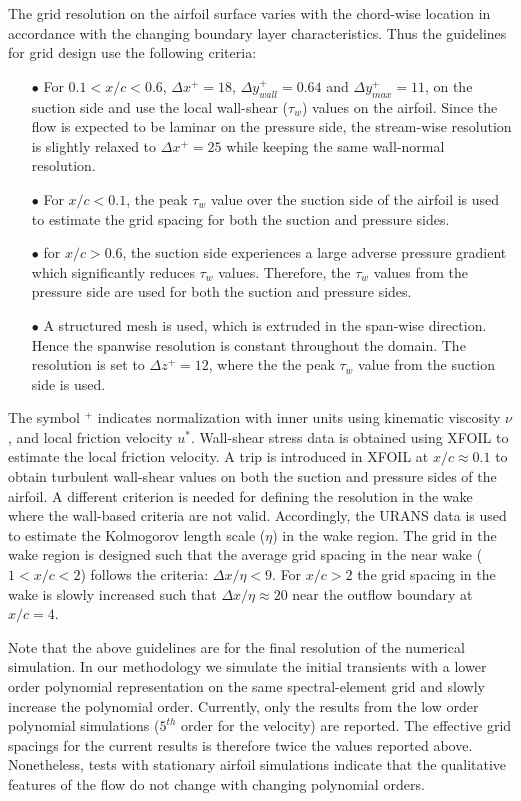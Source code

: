 The grid resolution on the airfoil surface varies with the chord-wise location in accordance with the changing boundary layer characteristics. Thus the guidelines for grid design use the following criteria:
\begin{itemize}
	\item[$\bullet$] For $0.1<x/c<0.6$, $\Delta x^{+}=18$, $\Delta y_{wall}^{+}=0.64$ and $\Delta y_{max}^{+}=11$, on the suction side and use the local wall-shear ($\tau_{w}$) values on the airfoil. Since the flow is expected to be laminar on the pressure side, the stream-wise resolution is slightly relaxed to $\Delta x^{+}=25$ while keeping the same wall-normal resolution.
	\item[$\bullet$] For $x/c<0.1$, the peak $\tau_{w}$ value over the suction side of the airfoil is used to estimate the grid spacing for both the suction and pressure sides.
	\item [$\bullet$] for $x/c>0.6$, the suction side experiences a large adverse pressure gradient which significantly reduces $\tau_{w}$ values. Therefore, the $\tau_{w}$ values from the pressure side are used for both the suction and pressure sides.
	\item [$\bullet$] A structured mesh is used, which is extruded in the span-wise direction. Hence the spanwise resolution is constant throughout the domain. The resolution is set to $\Delta z^{+}=12$, where the the peak $\tau_{w}$ value from the suction side is used.
\end{itemize}
The symbol $^{+}$ indicates normalization with inner units using kinematic viscosity $\nu$, and local friction velocity $u^{*}$. Wall-shear stress data is obtained using XFOIL to estimate the local friction velocity. A trip is introduced in XFOIL at $x/c\approx0.1$ to obtain turbulent wall-shear values on both the suction and pressure sides of the airfoil. A different criterion is needed for defining the resolution in the wake where the wall-based criteria are not valid. Accordingly, the URANS data is used to estimate the Kolmogorov length scale ($\eta$) in the wake region. The grid in the wake region is designed such that the average grid spacing in the near wake ($1<x/c<2$) follows the criteria: $\Delta x/\eta < 9$. For $x/c>2$ the grid spacing in the wake is slowly increased such that $\Delta x/\eta \approx 20$ near the outflow boundary at $x/c=4$.

Note that the above guidelines are for the final resolution of the numerical simulation. In our methodology we simulate the initial transients with a lower order polynomial representation on the same spectral-element grid and slowly increase the polynomial order. Currently, only the results from the low order polynomial simulations ($5^{th}$ order for the velocity) are reported. The effective grid spacings for the current results is therefore twice the values reported above. Nonetheless, tests with stationary airfoil simulations indicate that the qualitative features of the flow do not change with changing polynomial orders. 

